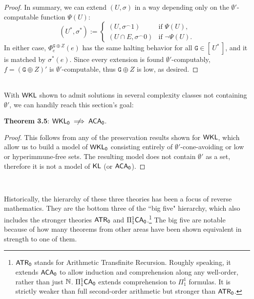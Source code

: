 \documentclass{amsart}
\begin{document}
\begin{proof}
		In summary, we can extend $(U,\sigma)$ in a way depending only on the $\emptyset'$-computable function $\Psi(U)$:
		$$
		(U^*,\sigma^*) := \begin{cases}
			(U,\sigma^{\smallfrown} 1) & \text{if $\Psi(U)$,}\\
			(U \cap E,\sigma^{\smallfrown} 0) & \text{if $\neg\Psi(U)$.}
		\end{cases}
		$$
		In either case, $\Phi^{\mathtt{G}\oplus Z}_e(e)$ has the same halting behavior for all $\mathtt{G}\in [\, U^* \,]$, and it is matched by $\sigma^*(e)$. Since every extension is found $\emptyset'$-computably, $f=(\mathtt{G}\oplus Z)'$ is $\emptyset'$-computable, thus $\mathtt{G}\oplus Z$ is low, as desired.
	\end{proof}\\
	
	With $\sf{WKL}$ shown to admit solutions in several complexity classes not containing $\emptyset'$, we can handily reach this section's goal:\\
	
	\begin{samepage}
		
		\noindent \textbf{Theorem 3.5}: $\WKL\centernot \implies \ACA$.
		\begin{proof}
			This follows from any of the preservation results shown for $\sf{WKL}$, which allow us to build a model of $\operatorname{\sf{WKL_0}}$ consisting entirely of $\emptyset'$-cone-avoiding or low or hyperimmune-free sets. The resulting model does not contain $\emptyset'$ as a set, therefore it is not a model of $\operatorname{\sf{KL}}$ (or $\operatorname{\sf{ACA_0}}$).
		\end{proof}\\
		
	\end{samepage}
	
	\begin{figure}[h]
	\end{figure}
	
	Historically, the hierarchy of these three theories has been a focus of reverse mathematics. They are the bottom three of the ``big five" hierarchy, which also includes the stronger theories $\sf{ATR_0}$ and $\Pi^1_1\sf{CA_0}$.\footnote{$\sf{ATR_0}$ stands for Arithmetic Transfinite Recursion. Roughly speaking, it extends $\operatorname{\sf{ACA_0}}$ to allow induction and comprehension along any well-order, rather than just $\mathbb{N}$. $\Pi^1_1\sf{CA_0}$ extends comprehension to $\Pi^1_1$ formulas. It is strictly weaker than full second-order arithmetic but stronger than $\sf{ATR_0}$.} The big five are notable because of how many theorems from other areas have been shown equivalent in strength to one of them. 
	
\end{document}
